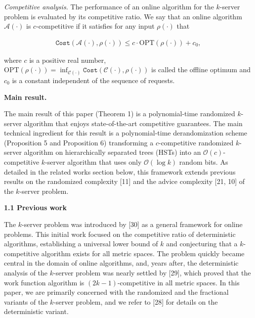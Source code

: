 \documentclass[10pt,a4paper]{article}
\begin{document}
\emph{Competitive analysis.} The performance of an online algorithm for the $k$-server problem is evaluated by its competitive ratio. We say that an online algorithm $\mathcal{A}(\cdot)$ is $c$-competitive if it satisfies for any input $\rho(\cdot)$ that\par


\[\begin{gathered}
{\texttt{Cost}}(\mathcal{A}(\cdot),\rho(\cdot))\leq c\cdot\text{OPT}(\rho(\cdot))+c_{0},
\end{gathered}\]


where $c$ is a positive real number, $\text{OPT}(\rho(\cdot))=\inf_{\mathcal{C}(\cdot)}{\texttt{Cost}}(\mathcal{C}(\cdot),\rho(\cdot))$ is called the offline optimum and $c_{0}$ is a constant independent of the sequence of requests.\par




\par\medskip\noindent\textbf{Main result.}\par




The main result of this paper (Theorem 1) is a polynomial-time randomized $k$-server algorithm that enjoys state-of-the-art competitive guarantees. The main technical ingredient for this result is a polynomial-time derandomization scheme (Proposition 5 and Proposition 6) transforming a $c$-competitive randomized $k$-server algorithm on hierarchically separated trees (HSTs) into an $\mathcal{O}(c)$-competitive $k$-server algorithm that uses only $\mathcal{O}(\log k)$ random bits. As detailed in the related works section below, this framework extends previous results on the randomized complexity [11] and the advice complexity [21, 10] of the $k$-server problem.\par





\par\medskip\noindent\textbf{
1.1 Previous work}\par




The $k$-server problem was introduced by [30] as a general framework for online problems.
This initial work focused on the competitive ratio of deterministic algorithms, establishing a universal lower bound of $k$ and conjecturing that a $k$-competitive algorithm exists for all metric spaces. The problem quickly became central in the domain of online algorithms, and, years after, the deterministic analysis of the $k$-server problem was nearly settled by [29], which proved that the work function algorithm is $(2k-1)$-competitive in all metric spaces. In this paper, we are primarily concerned with the randomized and the fractional variants of the $k$-server problem, and we refer to [28] for details on the deterministic variant.\par
\end{document}
